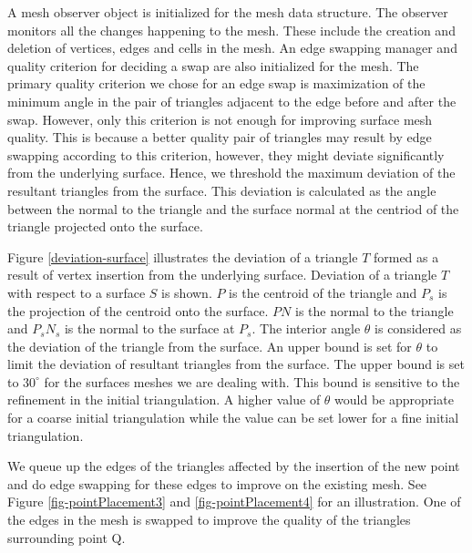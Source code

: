 A mesh observer object is initialized for the mesh data structure. The observer monitors all the changes happening to the mesh. These include the creation and deletion of vertices, edges and cells in the mesh. An edge swapping manager and quality criterion for deciding a swap are also initialized for the mesh. The primary quality criterion we chose for an edge swap is maximization of the minimum angle in the pair of triangles adjacent to the edge before and after the swap. However, only this criterion is not enough for improving surface mesh quality. This is because a better quality pair of triangles may result by edge swapping according to this criterion, however, they might deviate significantly from the underlying surface. Hence, we threshold the maximum deviation of the resultant triangles from the surface. This deviation is calculated as the angle between the normal to the triangle and the surface normal at the centriod of the triangle projected onto the surface. 

Figure \ref{deviation-surface} illustrates the deviation of a triangle $T$ formed as a result of vertex insertion from the underlying surface. Deviation of a triangle $T$ with respect to a surface $S$ is shown. $P$ is the centroid of the triangle and $P_s$ is the projection of the centroid onto the surface. $PN$ is the normal to the triangle and $P_sN_s$ is the normal to the surface at $P_s$. The interior angle $\theta$ is considered as the deviation of the triangle from the surface. An upper bound is set for $\theta$ to limit the deviation of resultant triangles from the surface.  The upper bound is set to ${30}^{\circ}$ for the surfaces meshes we are dealing with. This bound is sensitive to the refinement in the initial triangulation. A higher value of $\theta$ would be appropriate for a coarse initial triangulation while the value can be set lower for a fine initial triangulation.

We queue up the edges of the triangles affected by the insertion of the new point and do edge swapping for these edges to improve on the existing mesh. See Figure \ref{fig-pointPlacement3} and \ref{fig-pointPlacement4} for an illustration. One of the edges in the mesh is swapped to improve the quality of the triangles surrounding point Q.



